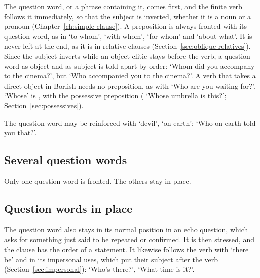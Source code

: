The question word, or a phrase containing it, comes first, and the finite verb follows it immediately, so that the subject is inverted, whether it is a noun or a pronoun (Chapter~\ref{ch:simple-clause}). A preposition is always fronted with its question word, as in  `to whom',  `with whom',  `for whom' and  `about what'. It is never left at the end, as it is in relative clauses (Section~\ref{sec:oblique-relatives}).
Since the subject inverts while an object clitic stays before the verb, a question word as object and as subject is told apart by order:  `Whom did you accompany to the cinema?', but  `Who accompanied you to the cinema?'. A verb that takes a direct object in Borlish needs no preposition, as with  `Who are you waiting for?'. `Whose' is , with the possessive preposition ( `Whose umbrella is this?'; Section~\ref{sec:possessives}).

The question word may be reinforced with  `devil', `on earth':  `Who on earth told you that?'.

\subsection{Several question words}
Only one question word is fronted. The others stay in place.

\subsection{Question words in place}
The question word also stays in its normal position in an echo question, which asks for something just said to be repeated or confirmed. It is then stressed, and the clause has the order of a statement.
It likewise follows the verb with  `there be' and  in its impersonal uses, which put their subject after the verb (Section~\ref{sec:impersonal}):  `Who's there?',  `What time is it?'.


